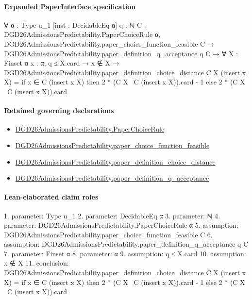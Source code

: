 \documentclass[10pt]{article}
\begin{document}
\paragraph{Expanded PaperInterface specification}
\begin{ReviewVerbatim}
∀ {α : Type u_1} [inst : DecidableEq α] {q : ℕ} {C : DGD26AdmissionsPredictability.PaperChoiceRule α},
  DGD26AdmissionsPredictability.paper_choice_function_feasible C →
    DGD26AdmissionsPredictability.paper_definition_q_acceptance q C →
      ∀ {X : Finset α} {x : α},
        q ≤ X.card →
          x ∉ X →
            DGD26AdmissionsPredictability.paper_definition_choice_distance C X (insert x X) =
              if x ∈ C (insert x X) then 2 * (C X \ C (insert x X)).card - 1 else 2 * (C X \ C (insert x X)).card
\end{ReviewVerbatim}

\paragraph{Retained governing declarations}
\begin{itemize}\raggedright
\item \hyperlink{governing-declaration-4678951b4432b184}{DGD26\allowbreak{}Admissions\allowbreak{}Predictability.\allowbreak{}Paper\allowbreak{}Choice\allowbreak{}Rule}
\item \hyperlink{governing-declaration-f7de74a44053f6d5}{DGD26\allowbreak{}Admissions\allowbreak{}Predictability.\allowbreak{}paper\_\allowbreak{}choice\_\allowbreak{}function\_\allowbreak{}feasible}
\item \hyperlink{governing-declaration-64f97a980e20e425}{DGD26\allowbreak{}Admissions\allowbreak{}Predictability.\allowbreak{}paper\_\allowbreak{}definition\_\allowbreak{}choice\_\allowbreak{}distance}
\item \hyperlink{governing-declaration-7ecd62274fb2f391}{DGD26\allowbreak{}Admissions\allowbreak{}Predictability.\allowbreak{}paper\_\allowbreak{}definition\_\allowbreak{}q\_\allowbreak{}acceptance}
\end{itemize}
\paragraph{Lean-elaborated claim roles}\begin{ReviewVerbatim}
1. parameter: Type u_1
2. parameter: DecidableEq α
3. parameter: ℕ
4. parameter: DGD26AdmissionsPredictability.PaperChoiceRule α
5. assumption: DGD26AdmissionsPredictability.paper_choice_function_feasible C
6. assumption: DGD26AdmissionsPredictability.paper_definition_q_acceptance q C
7. parameter: Finset α
8. parameter: α
9. assumption: q ≤ X.card
10. assumption: x ∉ X
11. conclusion: DGD26AdmissionsPredictability.paper_definition_choice_distance C X (insert x X) =
  if x ∈ C (insert x X) then 2 * (C X \ C (insert x X)).card - 1 else 2 * (C X \ C (insert x X)).card
\end{ReviewVerbatim}
\end{document}
